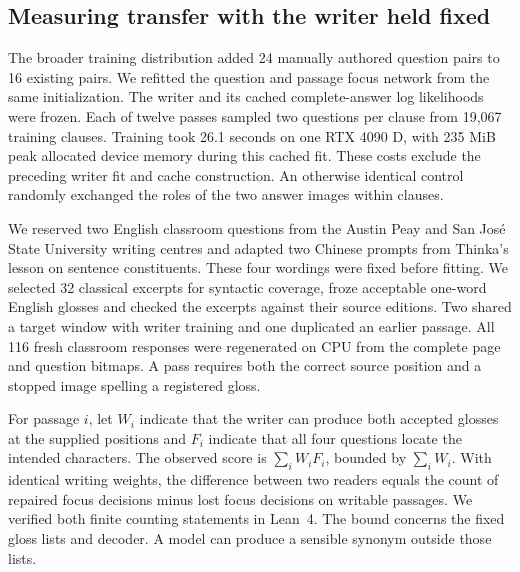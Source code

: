 \subsection*{Measuring transfer with the writer held fixed}
The broader training distribution added 24 manually authored question pairs to 16 existing pairs. We refitted the question and passage focus network from the same initialization. The writer and its cached complete-answer log likelihoods were frozen. Each of twelve passes sampled two questions per clause from 19,067 training clauses. Training took 26.1 seconds on one RTX 4090 D, with 235 MiB peak allocated device memory during this cached fit. These costs exclude the preceding writer fit and cache construction. An otherwise identical control randomly exchanged the roles of the two answer images within clauses.

We reserved two English classroom questions from the Austin Peay and San Jos\'e State University writing centres and adapted two Chinese prompts from Thinka's lesson on sentence constituents. These four wordings were fixed before fitting. We selected 32 classical excerpts for syntactic coverage, froze acceptable one-word English glosses and checked the excerpts against their source editions. Two shared a target window with writer training and one duplicated an earlier passage. All 116 fresh classroom responses were regenerated on CPU from the complete page and question bitmaps. A pass requires both the correct source position and a stopped image spelling a registered gloss.

For passage $i$, let $W_i$ indicate that the writer can produce both accepted glosses at the supplied positions and $F_i$ indicate that all four questions locate the intended characters. The observed score is $\sum_i W_i F_i$, bounded by $\sum_i W_i$. With identical writing weights, the difference between two readers equals the count of repaired focus decisions minus lost focus decisions on writable passages. We verified both finite counting statements in Lean~4. The bound concerns the fixed gloss lists and decoder. A model can produce a sensible synonym outside those lists.
